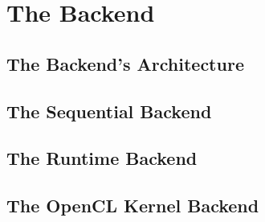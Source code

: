 
\section{The Backend}
\subsection{The Backend's Architecture}
\subsection{The Sequential Backend}
\subsection{The Runtime Backend}
\subsection{The OpenCL Kernel Backend}
